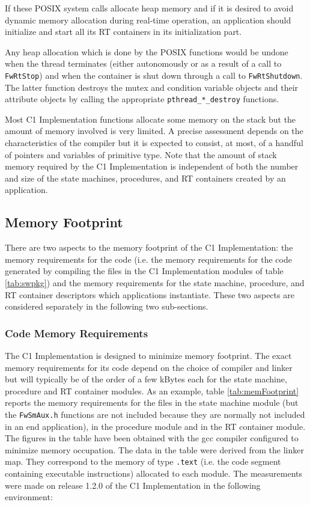 \documentclass[a4paper,10pt]{article}
\begin{document}
If these POSIX system calls allocate heap memory and if it is desired to avoid dynamic memory allocation during real-time operation, an application should initialize and start all its RT containers in its initialization part.

Any heap allocation which is done by the POSIX functions would be undone when the thread terminates (either autonomously or as a result of a call to \texttt{FwRtStop}) and when the container is shut down through a call to \texttt{FwRtShutdown}. The latter function destroys the mutex and condition variable objects and their attribute objects by calling the appropriate \texttt{pthread\_*\_destroy} functions.

Most C1 Implementation functions allocate some memory on the stack but the amount of memory involved is very limited. A precise assessment depends on the characteristics of the compiler but it is expected to consist, at most, of a handful of pointers and variables of primitive type. Note that the amount of stack memory required by the C1 Implementation is independent of both the number and size of the state machines, procedures, and RT containers created by an application.

\subsection{Memory Footprint}\label{sec:memFootprint}
There are two aspects to the memory footprint of the C1 Implementation: the memory requirements for the code (i.e. the memory requirements for the code generated by compiling the files in the C1 Implementation modules of table \ref{tab:swpkg}) and the memory requirements for the state machine, procedure, and RT container descriptors which applications instantiate. These two aspects are considered separately in the following two sub-sections.

\subsubsection{Code Memory Requirements}\label{sec:codeMemReq}
The C1 Implementation is designed to minimize memory footprint. The exact memory requirements for its code 
depend on the choice of compiler and linker but will typically be of the order of a few kBytes each for the 
state machine, procedure and RT container modules. As an example, table \ref{tab:memFootprint} reports the memory requirements 
for the files in the state machine module (but the \texttt{FwSmAux.h} functions are not included because  
they are normally not included in an end application), in the procedure module and in the RT container module. 
The figures in the table have been obtained with the gcc compiler configured to minimize memory occupation. 
The data in the table were derived from the linker map. 
They correspond to the memory of type \texttt{.text} (i.e. the code segment containing executable instructions) 
allocated to each module. The measurements were made on release 1.2.0 of the C1 Implementation in the following environment:
\end{document}
